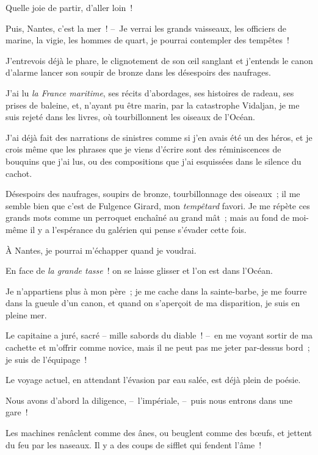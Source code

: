 \documentclass[french,twoside]{book} %
\begin{document}
\noindent Quelle joie de partir, d’aller loin !\par
Puis, Nantes, c’est la mer ! – Je verrai les grands vaisseaux, les officiers de marine, la vigie, les hommes de quart, je pourrai contempler des tempêtes !\par
J’entrevois déjà le phare, le clignotement de son œil sanglant et j’entends le canon d’alarme lancer son soupir de bronze dans les désespoirs des naufrages.\par
J’ai lu \emph{la France maritime}, ses récits d’abordages, ses histoires de radeau, ses prises de baleine, et, n’ayant pu être marin, par la catastrophe Vidaljan, je me suis rejeté dans les livres, où tourbillonnent les oiseaux de l’Océan.\par
J’ai déjà fait des narrations de sinistres comme si j’en avais été un des héros, et je crois même que les phrases que je viens d’écrire sont des réminiscences de bouquins que j’ai lus, ou des compositions que j’ai esquissées dans le silence du cachot.\par
Désespoirs des naufrages, soupirs de bronze, tourbillonnage des oiseaux ; il me semble bien que c’est de Fulgence Girard, mon \emph{tempêtard} favori. Je me répète ces grands mots comme un perroquet enchaîné au grand mât ; mais au fond de moi-même il y a l’espérance du galérien qui pense s’évader cette fois.\par
À Nantes, je pourrai m’échapper quand je voudrai.\par
En face de \emph{la grande tasse} ! on se laisse glisser et l’on est dans l’Océan.\par
Je n’appartiens plus à mon père ; je me cache dans la sainte-barbe, je me fourre dans la gueule d’un canon, et quand on s’aperçoit de ma disparition, je suis en pleine mer.\par
Le capitaine a juré, sacré – mille sabords du diable ! – en me voyant sortir de ma cachette et m’offrir comme novice, mais il ne peut pas me jeter par-dessus bord ; je suis de l’équipage !\par
\bigbreak
\noindent Le voyage actuel, en attendant l’évasion par eau salée, est déjà plein de poésie.\par
Nous avons d’abord la diligence, – l’impériale, – puis nous entrons dans une gare !\par
Les machines renâclent comme des ânes, ou beuglent comme des bœufs, et jettent du feu par les naseaux. Il y a des coups de sifflet qui fendent l’âme !\par
\end{document}
